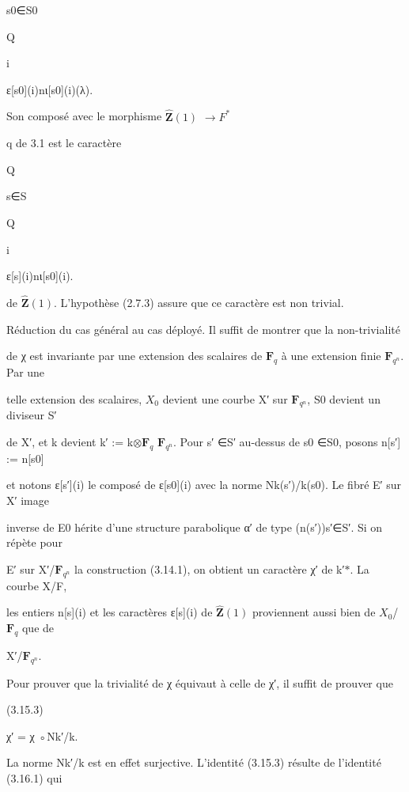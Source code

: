 \documentclass[11pt]{article}
\begin{document}
\noindent s0∈S0\par
\noindent Q\par
\noindent i\par
\noindent ε[s0](i)nι[s0](i)(λ).\par
\noindent Son composé avec le morphisme \(\widehat{\mathbf Z}(1)\) \(\to\)\(F^*\)\par
\noindent q de 3.1 est le caractère\par
\noindent Q\par
\noindent s∈S\par
\noindent Q\par
\noindent i\par
\noindent ε[s](i)nι[s0](i).\par
\noindent de \(\widehat{\mathbf Z}(1)\). L’hypothèse (2.7.3) assure que ce caractère est non trivial.\par
\noindent Réduction du cas général au cas déployé. Il suffit de montrer que la non-trivialité\par
\noindent de χ est invariante par une extension des scalaires de \(\mathbf F_q\) à une extension finie \(\mathbf F_{q^n}\). Par une\par
\noindent telle extension des scalaires, \(X_0\) devient une courbe X′ sur \(\mathbf F_{q^n}\), S0 devient un diviseur S′\par
\noindent de X′, et k devient k′ := k\(\otimes\)\(\mathbf F_q\) \(\mathbf F_{q^n}\). Pour s′ ∈S′ au-dessus de s0 ∈S0, posons n[s′] := n[s0]\par
\noindent et notons ε[s′](i) le composé de ε[s0](i) avec la norme Nk(s′)/k(s0). Le fibré E′ sur X′ image\par
\noindent inverse de E0 hérite d’une structure parabolique α′ de type (n(s′))s′∈S′. Si on répète pour\par
\noindent E′ sur X′/\(\mathbf F_{q^n}\) la construction (3.14.1), on obtient un caractère χ′ de k′\(*\). La courbe X/F,\par
\noindent les entiers n[s](i) et les caractères ε[s](i) de \(\widehat{\mathbf Z}(1)\) proviennent aussi bien de \(X_0\)/\(\mathbf F_q\) que de\par
\noindent X′/\(\mathbf F_{q^n}\).\par
\noindent Pour prouver que la trivialité de χ équivaut à celle de χ′, il suffit de prouver que\par
\noindent (3.15.3)\par
\noindent χ′ = χ ◦Nk′/k.\par
\noindent La norme Nk′/k est en effet surjective. L’identité (3.15.3) résulte de l’identité (3.16.1) qui\par
\end{document}
